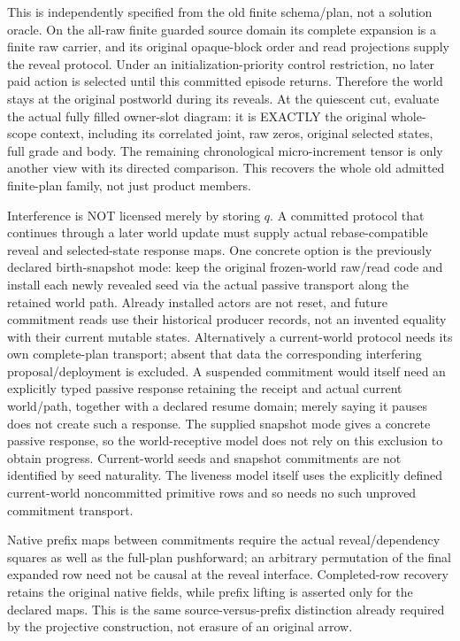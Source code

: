 \documentclass[11pt]{article}\usepackage{amsmath,amssymb,amsthm}
\begin{document}
This is independently specified from the old finite schema/plan, not a solution oracle. On the all-raw finite guarded source domain its complete expansion is a finite raw carrier, and its original opaque-block order and read projections supply the reveal protocol. Under an initialization-priority control restriction, no later paid action is selected until this committed episode returns. Therefore the world stays at the original postworld during its reveals. At the quiescent cut, evaluate the actual fully filled owner-slot diagram: it is EXACTLY the original whole-scope context, including its correlated joint, raw zeros, original selected states, full grade and body. The remaining chronological micro-increment tensor is only another view with its directed comparison. This recovers the whole old admitted finite-plan family, not just product members.

Interference is NOT licensed merely by storing $q$. A committed protocol that continues through a later world update must supply actual rebase-compatible reveal and selected-state response maps. One concrete option is the previously declared birth-snapshot mode: keep the original frozen-world raw/read code and install each newly revealed seed via the actual passive transport along the retained world path. Already installed actors are not reset, and future commitment reads use their historical producer records, not an invented equality with their current mutable states. Alternatively a current-world protocol needs its own complete-plan transport; absent that data the corresponding interfering proposal/deployment is excluded. A suspended commitment would itself need an explicitly typed passive response retaining the receipt and actual current world/path, together with a declared resume domain; merely saying it pauses does not create such a response. The supplied snapshot mode gives a concrete passive response, so the world-receptive model does not rely on this exclusion to obtain progress. Current-world seeds and snapshot commitments are not identified by seed naturality. The liveness model itself uses the explicitly defined current-world noncommitted primitive rows and so needs no such unproved commitment transport.

Native prefix maps between commitments require the actual reveal/dependency squares as well as the full-plan pushforward; an arbitrary permutation of the final expanded row need not be causal at the reveal interface. Completed-row recovery retains the original native fields, while prefix lifting is asserted only for the declared maps. This is the same source-versus-prefix distinction already required by the projective construction, not erasure of an original arrow.
\end{document}
